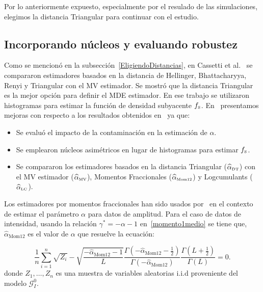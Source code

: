 Por lo anteriormente expuesto, especialmente por el resulado de las simulaciones, elegimos la distancia Triangular para continuar con el estudio.


\subsection{Incorporando núcleos y evaluando robustez}
\label{jstar}

Como se mencionó en la subsección~\ref{EligiendoDistancias}, en Cassetti et al.~\cite{APSAR2013ParameterEstimationStochasticDistances} se compararon estimadores basados en la distancia de Hellinger, Bhattacharyya, Renyi y Triangular con el MV estimador. Se mostró que la distancia Triangular es la mejor opción para definir el MDE estimador. En ese trabajo se utilizaron histogramas para estimar la función de densidad subyacente $f_{\text{\tiny{S}}}$. En~\cite{gambini2015} %
presentamos mejoras con respecto a los resultados obtenidos en~\cite{APSAR2013ParameterEstimationStochasticDistances} ya que: 
\begin{itemize}
	\item Se evaluó el impacto de la contaminación en la estimación de $\alpha$.
	\item Se emplearon núcleos asimétricos en lugar de histogramas para estimar $f_{\text{\tiny{S}}}$.
	\item Se compararon los estimadores basados en la distancia Triangular ($\widehat{\alpha}_{\text{\tiny{DT}}}$) con el MV estimador ($\widehat{\alpha}_{\text{\tiny{MV}}}$), Momentos Fraccionales ($\widehat{\alpha}_{\text{\tiny{Mom12}}}$) y Logcumulants ($\widehat{\alpha}_{\text{\tiny{LC}}}$). 
\end{itemize}

Los estimadores por momentos fraccionales han sido usados por~\cite{Frery97,GambiniSC08} en el contexto de estimar el parámetro $\alpha$ para datos de amplitud. Para el caso de datos de intensidad, usando la relación $\gamma^*=-\alpha-1$ en~\ref{momento1medio} se tiene que, $\widehat{\alpha}_\text{Mom12}$ es el valor de $\alpha$ que resuelve la ecuación:

\begin{equation}
\frac{1}{n} \sum_{i=1}^n \sqrt{Z_i} -\sqrt{\frac{-\widehat\alpha_{\text{Mom12}}-1}{L}}\frac{\Gamma ( -\widehat\alpha_{\text{Mom12}}-{\frac{1}{2}} )}{ \Gamma (-\widehat\alpha_{\text{Mom12}}) }
\frac{\Gamma (L+{\frac{1}{2}} )}{\Gamma (L)}=0.
\label{estim_moment1_2_gI0}
\end{equation}
donde $Z_1,\ldots,Z_n$ es una muestra de variables aleatorias i.i.d proveniente del modelo $\mathcal{G}_I^0$.

